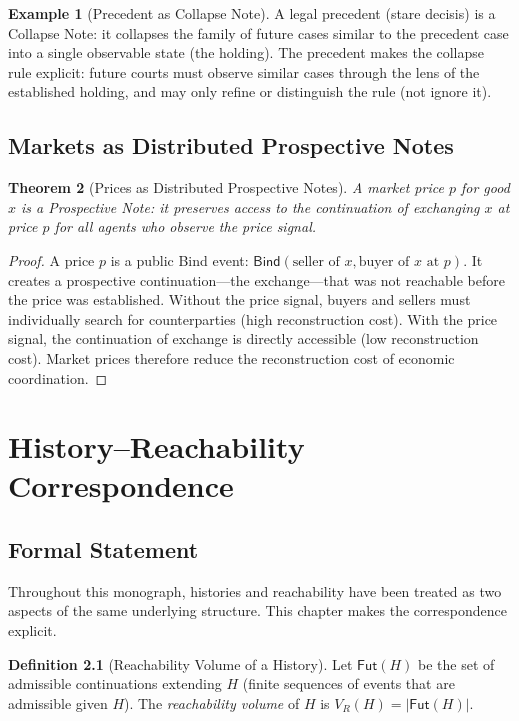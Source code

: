 \documentclass[12pt, a4paper, openany]{book}
\theoremstyle{plain}
\newtheorem{theorem}{Theorem}[chapter]
\theoremstyle{definition}
\newtheorem{definition}[theorem]{Definition}
\newtheorem{example}[theorem]{Example}
\theoremstyle{remark}
\newcommand{\Bind}{\mathsf{Bind}}
\begin{document}
\begin{example}[Precedent as Collapse Note]
A legal precedent (stare decisis) is a Collapse Note: it collapses the family
of future cases similar to the precedent case into a single observable state
(the holding). The precedent makes the collapse rule explicit: future courts
must observe similar cases through the lens of the established holding, and
may only refine or distinguish the rule (not ignore it).
\end{example}

\section{Markets as Distributed Prospective Notes}

\begin{theorem}[Prices as Distributed Prospective Notes]
A market price $p$ for good $x$ is a Prospective Note: it preserves access
to the continuation of exchanging $x$ at price $p$ for all agents who observe
the price signal.
\end{theorem}

\begin{proof}
A price $p$ is a public Bind event: $\Bind(\text{seller of } x, \text{buyer of } x \text{ at } p)$.
It creates a prospective continuation---the exchange---that was not reachable
before the price was established. Without the price signal, buyers and sellers
must individually search for counterparties (high reconstruction cost). With
the price signal, the continuation of exchange is directly accessible
(low reconstruction cost). Market prices therefore reduce the reconstruction
cost of economic coordination.
\end{proof}

\chapter{History--Reachability Correspondence}

\section{Formal Statement}

Throughout this monograph, histories and reachability have been treated as
two aspects of the same underlying structure. This chapter makes the
correspondence explicit.

\begin{definition}[Reachability Volume of a History]
Let $\mathsf{Fut}(H)$ be the set of admissible continuations extending $H$
(finite sequences of events that are admissible given $H$). The
\emph{reachability volume} of $H$ is $V_R(H) = |\mathsf{Fut}(H)|$.
\end{definition}
\end{document}
